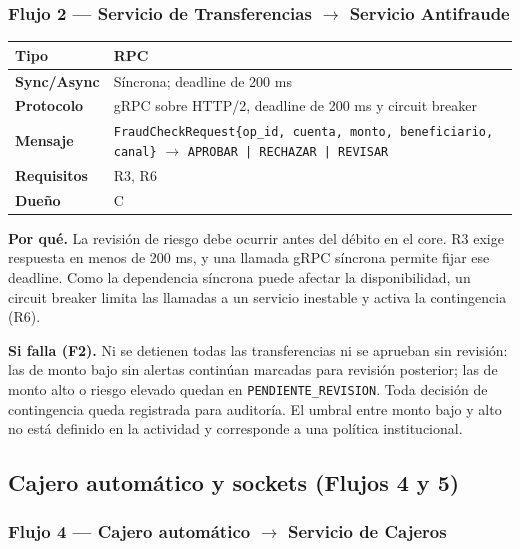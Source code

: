 \documentclass[11pt,a4paper]{article}
\begin{document}
\subsubsection*{Flujo 2 --- Servicio de Transferencias $\rightarrow$ Servicio Antifraude}

\begin{tabular}{|l|p{9.5cm}|}
\hline
\textbf{Tipo} & RPC \\ \hline
\textbf{Sync/Async} & Síncrona; deadline de 200 ms \\ \hline
\textbf{Protocolo} & gRPC sobre HTTP/2, deadline de 200 ms y circuit breaker \\ \hline
\textbf{Mensaje} & \texttt{FraudCheckRequest\{op\_id, cuenta, monto, beneficiario, canal\}}
                   $\rightarrow$ \texttt{APROBAR | RECHAZAR | REVISAR} \\ \hline
\textbf{Requisitos} & R3, R6 \\ \hline
\textbf{Dueño} & C \\ \hline
\end{tabular}

\medskip
\textbf{Por qué.} La revisión de riesgo debe ocurrir antes del débito en el core. R3 exige
respuesta en menos de 200 ms, y una llamada gRPC síncrona permite fijar ese deadline. Como la
dependencia síncrona puede afectar la disponibilidad, un circuit breaker limita las llamadas a un
servicio inestable y activa la contingencia (R6).

\textbf{Si falla (F2).} Ni se detienen todas las transferencias ni se aprueban sin revisión: las
de monto bajo sin alertas continúan marcadas para revisión posterior; las de monto alto o riesgo
elevado quedan en \texttt{PENDIENTE\_REVISION}. Toda decisión de contingencia queda registrada
para auditoría. El umbral entre monto bajo y alto no está definido en la actividad y corresponde
a una política institucional.

\subsection{Cajero automático y sockets (Flujos 4 y 5)}

\subsubsection*{Flujo 4 --- Cajero automático $\rightarrow$ Servicio de Cajeros}
\end{document}

